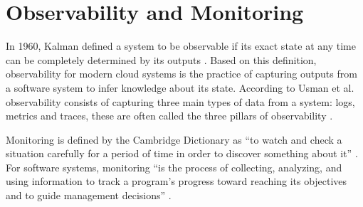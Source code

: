 \section{Observability and Monitoring}

In 1960, Kalman defined a system to be observable if its exact state at any time can be completely determined
by its outputs \cite{OnTheGeneralTheoryOfControlSystems}. Based on this definition, observability
for modern cloud systems is the practice of capturing outputs from a software system to
infer knowledge about its state. According to Usman et al. observability consists of capturing
three main types of data from a system: logs, metrics and traces, these are often called the
three pillars of observability \cite{ASurveyOnObservabilityOfDistributedEdgeContainerBasedMicroservices}.


Monitoring is defined by the Cambridge Dictionary as
\enquote{to watch and check a situation carefully for a period of time in order to discover something about it}
\cite{CambridgeDictionary}.
For software systems, monitoring 
\enquote{is the process of collecting, analyzing, and using information to track a program's progress toward reaching its objectives and to guide management decisions}
\cite{DynatraceBlog}.






